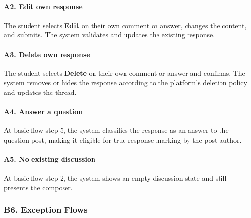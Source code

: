 \documentclass[12pt]{article}
\begin{document}
\hypertarget{sec:a2-edit-own-response}{}
\paragraph*{A2. Edit own response}
\par\medskip

The student selects \textbf{Edit} on their own comment or answer, changes the content, and submits. The system validates and updates the existing response.
\par\medskip

\hypertarget{sec:a3-delete-own-response}{}
\paragraph*{A3. Delete own response}
\par\medskip

The student selects \textbf{Delete} on their own comment or answer and confirms. The system removes or hides the response according to the platform's deletion policy and updates the thread.
\par\medskip

\hypertarget{sec:a4-answer-a-question}{}
\paragraph*{A4. Answer a question}
\par\medskip

At basic flow step 5, the system classifies the response as an answer to the question post, making it eligible for true-response marking by the post author.
\par\medskip

\hypertarget{sec:a5-no-existing-discussion}{}
\paragraph*{A5. No existing discussion}
\par\medskip

At basic flow step 2, the system shows an empty discussion state and still presents the composer.
\par\medskip

\hypertarget{sec:b6-exception-flows}{}
\subsubsection*{B6. Exception Flows}
\par\medskip
\end{document}
